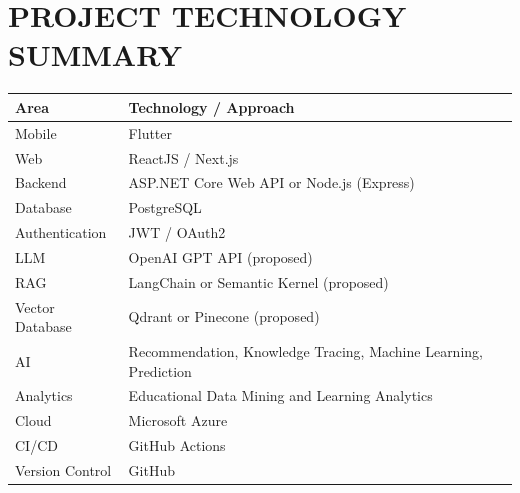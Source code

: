 \documentclass[12pt,a4paper]{report}
\begin{document}
\chapter{PROJECT TECHNOLOGY SUMMARY}

\begin{longtable}{p{}p{}}
\toprule
\textbf{Area} & \textbf{Technology / Approach}\\
\midrule
Mobile & Flutter\\
Web & ReactJS / Next.js\\
Backend & ASP.NET Core Web API or Node.js (Express)\\
Database & PostgreSQL\\
Authentication & JWT / OAuth2\\
LLM & OpenAI GPT API (proposed)\\
RAG & LangChain or Semantic Kernel (proposed)\\
Vector Database & Qdrant or Pinecone (proposed)\\
AI & Recommendation, Knowledge Tracing, Machine Learning, Prediction\\
Analytics & Educational Data Mining and Learning Analytics\\
Cloud & Microsoft Azure\\
CI/CD & GitHub Actions\\
Version Control & GitHub\\
\bottomrule
\end{longtable}
\end{document}
